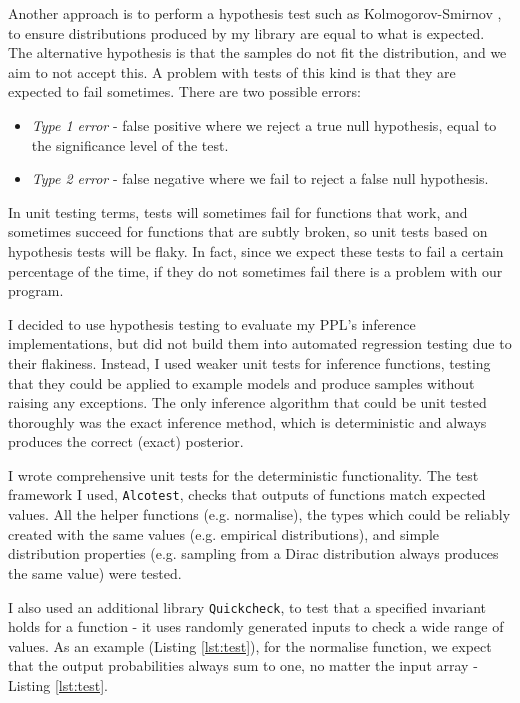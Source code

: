\documentclass[sigconf]{acmart}
\begin{document}
Another approach is to perform a hypothesis test such as Kolmogorov-Smirnov \cite{massey1951kolmogorov}, to ensure distributions produced by my library are equal to what is expected. The alternative hypothesis is that the samples do not fit the distribution, and we aim to not accept this. A problem with tests of this kind is that they are expected to fail sometimes. There are two possible errors:
\begin{itemize}
\item \textit{Type 1 error} - false positive where we reject a true null hypothesis, equal to the significance level of the test.
\item \textit{Type 2 error} - false negative where we fail to reject a false null hypothesis.
\end{itemize}
In unit testing terms, tests will sometimes fail for functions that work, and sometimes succeed for functions that are subtly broken, so unit tests based on hypothesis tests will be flaky. In fact, since we expect these tests to fail a certain percentage of the time, if they do not sometimes fail there is a problem with our program.

I decided to use hypothesis testing to evaluate my PPL's inference implementations, but did not build them into automated regression testing due to their flakiness. Instead, I used weaker unit tests for inference functions, testing that they could be applied to example models and produce samples without raising any exceptions. The only inference algorithm that could be unit tested thoroughly was the exact inference method, which is deterministic and always produces the correct (exact) posterior.

I wrote comprehensive unit tests for the deterministic functionality. The test framework I used, \texttt{Alcotest}, checks that outputs of functions match expected values. All the helper functions (e.g. normalise), the types which could be reliably created with the same values (e.g. empirical distributions), and simple distribution properties (e.g. sampling from a Dirac distribution always produces the same value) were tested.

I also used an additional library \texttt{Quickcheck}, to test that a specified invariant holds for a function - it uses randomly generated inputs to check a wide range of values. As an example (Listing \ref{lst:test}), for the normalise function, we expect that the output probabilities always sum to one, no matter the input array - Listing \ref{lst:test}.
\end{document}
